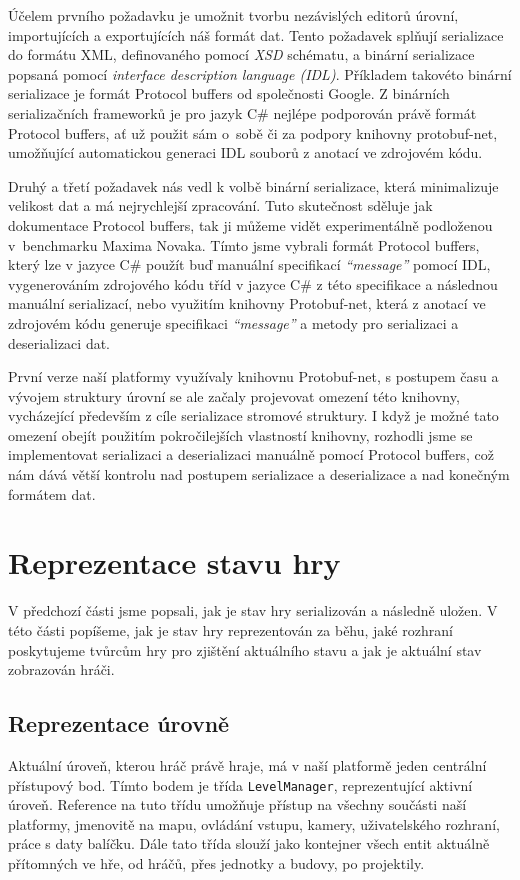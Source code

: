 Účelem prvního požadavku je umožnit tvorbu nezávislých editorů úrovní, importujících a exportujících náš formát dat. Tento požadavek splňují serializace do formátu XML, definovaného pomocí \textit{XSD} schématu, a binární serializace popsaná pomocí \textit{interface description language (IDL)}. Příkladem takovéto binární serializace je formát Protocol buffers\citep{site:protobuf} od společnosti Google. Z binárních serializačních frameworků je pro jazyk C\# nejlépe podporován právě formát Protocol buffers, ať už použit sám o~sobě či za podpory knihovny protobuf-net, umožňující automatickou generaci IDL souborů z anotací ve zdrojovém kódu. 

Druhý a třetí požadavek nás vedl k volbě binární serializace, která minimalizuje velikost dat a má nejrychlejší zpracování. Tuto skutečnost sděluje jak dokumentace Protocol buffers\citep{site:protobufdevguide}, tak ji můžeme vidět experimentálně podloženou v~benchmarku Maxima Novaka\citep{site:serializationspeed}. Tímto jsme vybrali formát Protocol buffers, který lze v jazyce C\# použít buď manuální specifikací \textit{``message''} pomocí IDL, vygenerováním zdrojového kódu tříd v jazyce C\# z této specifikace a následnou manuální serializací, nebo využitím knihovny Protobuf-net, která z anotací ve zdrojovém kódu generuje specifikaci \textit{``message''} a  metody pro serializaci a deserializaci dat.

První verze naší platformy využívaly knihovnu Protobuf-net, s postupem času a vývojem struktury úrovní se ale začaly projevovat omezení této knihovny, vycházející především z cíle serializace stromové struktury. I když je možné tato omezení obejít použitím pokročilejších vlastností knihovny, rozhodli jsme se implementovat serializaci a deserializaci manuálně pomocí Protocol buffers, což nám dává větší kontrolu nad postupem serializace a deserializace a nad konečným formátem dat.

\section{Reprezentace stavu hry}
V předchozí části jsme popsali, jak je stav hry serializován a následně uložen. V této části popíšeme, jak je stav hry reprezentován za běhu, jaké rozhraní poskytujeme tvůrcům hry pro zjištění aktuálního stavu a jak je aktuální stav zobrazován hráči.

\subsection{Reprezentace úrovně}
Aktuální úroveň, kterou hráč právě hraje, má v naší platformě jeden centrální přístupový bod. Tímto bodem je třída \texttt{LevelManager}, reprezentující aktivní úroveň. Reference na tuto třídu umožňuje přístup na všechny součásti naší platformy, jmenovitě na mapu, ovládání vstupu, kamery, uživatelského rozhraní, práce s daty balíčku. Dále tato třída slouží jako kontejner všech entit aktuálně přítomných ve hře, od hráčů, přes jednotky a budovy, po projektily. 

